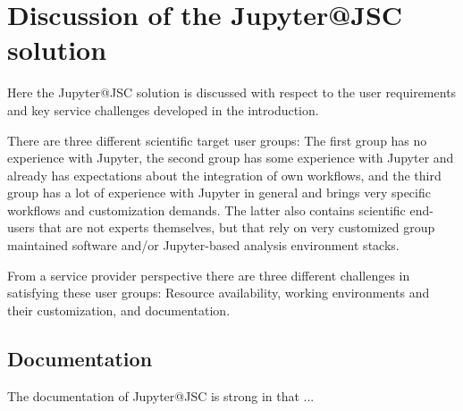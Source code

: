 \section{Discussion of the Jupyter@JSC solution}


Here the Jupyter@JSC solution is discussed with respect to the user requirements and key service challenges developed in the introduction.

There are three different scientific target user groups: The first group has no experience with Jupyter, the second group has some experience with Jupyter and already has expectations about the integration of own workflows, and the third group has a lot of experience with Jupyter in general and brings very specific workflows and customization demands.
The latter also contains scientific end-users that are not experts themselves, but that rely on very customized group maintained software and/or Jupyter-based analysis environment stacks.

From a service provider perspective there are three different challenges in satisfying these user groups: Resource availability, working environments and their customization, and documentation.

\subsection{Documentation}


The documentation of Jupyter@JSC is strong in that ...


